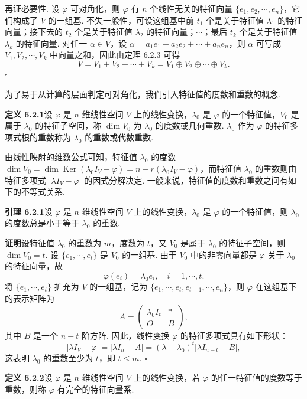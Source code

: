 \documentclass[UTF8,12pt,a4paper,fontset=fandol]{ctexart}
\begin{document}
再证必要性. 设 $\varphi$ 可对角化，则 $\varphi$ 有 $n$ 个线性无关的特征向量 $\{e_1,e_2,\cdots,e_n\}$，它们构成了 $V$ 的一组基. 不失一般性，可设这组基中前 $t_1$ 个是关于特征值 $\lambda_1$ 的特征向量；接下去的 $t_2$ 个是关于特征值 $\lambda_2$ 的特征向量；$\cdots$；最后 $t_k$ 个是关于特征值 $\lambda_k$ 的特征向量. 对任一 $\alpha\in V$，设 $\alpha=a_1e_1+a_2e_2+\cdots+a_ne_n$，则 $\alpha$ 可写成 $V_1,V_2,\cdots,V_k$ 中向量之和，因此由定理 6.2.3 可得
\[
V=V_1+V_2+\cdots+V_k=V_1\oplus V_2\oplus\cdots\oplus V_k.
\]
$\square$

为了易于从计算的层面判定可对角化，我们引入特征值的度数和重数的概念.

\noindent\textbf{定义 6.2.1}\quad 设 $\varphi$ 是 $n$ 维线性空间 $V$ 上的线性变换，$\lambda_0$ 是 $\varphi$ 的一个特征值，$V_0$ 是属于 $\lambda_0$ 的特征子空间，称 $\dim V_0$ 为 $\lambda_0$ 的度数或几何重数. $\lambda_0$ 作为 $\varphi$ 的特征多项式根的重数称为 $\lambda_0$ 的重数或代数重数.

由线性映射的维数公式可知，特征值 $\lambda_0$ 的度数 $\dim V_0=\dim\operatorname{Ker}(\lambda_0I_V-\varphi)=n-r(\lambda_0I_V-\varphi)$，而特征值 $\lambda_0$ 的重数则由特征多项式 $|\lambda I_V-\varphi|$ 的因式分解决定. 一般来说，特征值的度数和重数之间有如下的不等式关系.

\noindent\textbf{引理 6.2.1}\quad 设 $\varphi$ 是 $n$ 维线性空间 $V$ 上的线性变换，$\lambda_0$ 是 $\varphi$ 的一个特征值，则 $\lambda_0$ 的度数总是小于等于 $\lambda_0$ 的重数.

\noindent\textbf{证明}\quad 设特征值 $\lambda_0$ 的重数为 $m$，度数为 $t$，又 $V_0$ 是属于 $\lambda_0$ 的特征子空间，则 $\dim V_0=t$. 设 $\{e_1,\cdots,e_t\}$ 是 $V_0$ 的一组基. 由于 $V_0$ 中的非零向量都是 $\varphi$ 关于 $\lambda_0$ 的特征向量，故
\[
\varphi(e_i)=\lambda_0e_i,\quad i=1,\cdots,t.
\]
将 $\{e_1,\cdots,e_t\}$ 扩充为 $V$ 的一组基，记为 $\{e_1,\cdots,e_t,e_{t+1},\cdots,e_n\}$，则 $\varphi$ 在这组基下的表示矩阵为
\begin{equation}
A=\left(\begin{array}{cc}
\lambda_0I_t & *\\
O & B
\end{array}\right),
\tag{6.2.5}
\end{equation}
其中 $B$ 是一个 $n-t$ 阶方阵. 因此，线性变换 $\varphi$ 的特征多项式具有如下形状：
\[
|\lambda I_V-\varphi|=|\lambda I_n-A|=(\lambda-\lambda_0)^t|\lambda I_{n-t}-B|,
\]
这表明 $\lambda_0$ 的重数至少为 $t$，即 $t\leq m$. $\square$

\noindent\textbf{定义 6.2.2}\quad 设 $\varphi$ 是 $n$ 维线性空间 $V$ 上的线性变换，若 $\varphi$ 的任一特征值的度数等于重数，则称 $\varphi$ 有完全的特征向量系.
\end{document}
